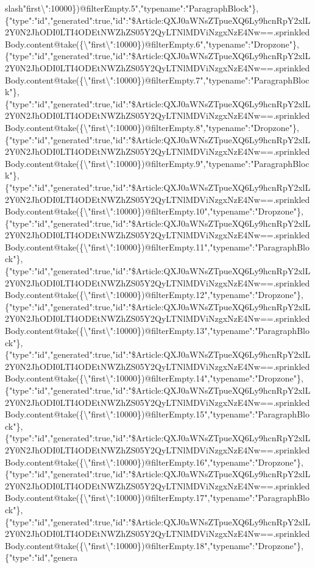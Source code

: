 slash{}"first\textbackslash{}":10000\})@filterEmpty.5","typename":"ParagraphBlock"\},\{"type":"id","generated":true,"id":"\$Article:QXJ0aWNsZTpueXQ6Ly9hcnRpY2xlL2Y0N2JhODI0LTI4ODEtNWZhZS05Y2QyLTNlMDViNzgxNzE4Nw==.sprinkledBody.content@take(\{\textbackslash{}"first\textbackslash{}":10000\})@filterEmpty.6","typename":"Dropzone"\},\{"type":"id","generated":true,"id":"\$Article:QXJ0aWNsZTpueXQ6Ly9hcnRpY2xlL2Y0N2JhODI0LTI4ODEtNWZhZS05Y2QyLTNlMDViNzgxNzE4Nw==.sprinkledBody.content@take(\{\textbackslash{}"first\textbackslash{}":10000\})@filterEmpty.7","typename":"ParagraphBlock"\},\{"type":"id","generated":true,"id":"\$Article:QXJ0aWNsZTpueXQ6Ly9hcnRpY2xlL2Y0N2JhODI0LTI4ODEtNWZhZS05Y2QyLTNlMDViNzgxNzE4Nw==.sprinkledBody.content@take(\{\textbackslash{}"first\textbackslash{}":10000\})@filterEmpty.8","typename":"Dropzone"\},\{"type":"id","generated":true,"id":"\$Article:QXJ0aWNsZTpueXQ6Ly9hcnRpY2xlL2Y0N2JhODI0LTI4ODEtNWZhZS05Y2QyLTNlMDViNzgxNzE4Nw==.sprinkledBody.content@take(\{\textbackslash{}"first\textbackslash{}":10000\})@filterEmpty.9","typename":"ParagraphBlock"\},\{"type":"id","generated":true,"id":"\$Article:QXJ0aWNsZTpueXQ6Ly9hcnRpY2xlL2Y0N2JhODI0LTI4ODEtNWZhZS05Y2QyLTNlMDViNzgxNzE4Nw==.sprinkledBody.content@take(\{\textbackslash{}"first\textbackslash{}":10000\})@filterEmpty.10","typename":"Dropzone"\},\{"type":"id","generated":true,"id":"\$Article:QXJ0aWNsZTpueXQ6Ly9hcnRpY2xlL2Y0N2JhODI0LTI4ODEtNWZhZS05Y2QyLTNlMDViNzgxNzE4Nw==.sprinkledBody.content@take(\{\textbackslash{}"first\textbackslash{}":10000\})@filterEmpty.11","typename":"ParagraphBlock"\},\{"type":"id","generated":true,"id":"\$Article:QXJ0aWNsZTpueXQ6Ly9hcnRpY2xlL2Y0N2JhODI0LTI4ODEtNWZhZS05Y2QyLTNlMDViNzgxNzE4Nw==.sprinkledBody.content@take(\{\textbackslash{}"first\textbackslash{}":10000\})@filterEmpty.12","typename":"Dropzone"\},\{"type":"id","generated":true,"id":"\$Article:QXJ0aWNsZTpueXQ6Ly9hcnRpY2xlL2Y0N2JhODI0LTI4ODEtNWZhZS05Y2QyLTNlMDViNzgxNzE4Nw==.sprinkledBody.content@take(\{\textbackslash{}"first\textbackslash{}":10000\})@filterEmpty.13","typename":"ParagraphBlock"\},\{"type":"id","generated":true,"id":"\$Article:QXJ0aWNsZTpueXQ6Ly9hcnRpY2xlL2Y0N2JhODI0LTI4ODEtNWZhZS05Y2QyLTNlMDViNzgxNzE4Nw==.sprinkledBody.content@take(\{\textbackslash{}"first\textbackslash{}":10000\})@filterEmpty.14","typename":"Dropzone"\},\{"type":"id","generated":true,"id":"\$Article:QXJ0aWNsZTpueXQ6Ly9hcnRpY2xlL2Y0N2JhODI0LTI4ODEtNWZhZS05Y2QyLTNlMDViNzgxNzE4Nw==.sprinkledBody.content@take(\{\textbackslash{}"first\textbackslash{}":10000\})@filterEmpty.15","typename":"ParagraphBlock"\},\{"type":"id","generated":true,"id":"\$Article:QXJ0aWNsZTpueXQ6Ly9hcnRpY2xlL2Y0N2JhODI0LTI4ODEtNWZhZS05Y2QyLTNlMDViNzgxNzE4Nw==.sprinkledBody.content@take(\{\textbackslash{}"first\textbackslash{}":10000\})@filterEmpty.16","typename":"Dropzone"\},\{"type":"id","generated":true,"id":"\$Article:QXJ0aWNsZTpueXQ6Ly9hcnRpY2xlL2Y0N2JhODI0LTI4ODEtNWZhZS05Y2QyLTNlMDViNzgxNzE4Nw==.sprinkledBody.content@take(\{\textbackslash{}"first\textbackslash{}":10000\})@filterEmpty.17","typename":"ParagraphBlock"\},\{"type":"id","generated":true,"id":"\$Article:QXJ0aWNsZTpueXQ6Ly9hcnRpY2xlL2Y0N2JhODI0LTI4ODEtNWZhZS05Y2QyLTNlMDViNzgxNzE4Nw==.sprinkledBody.content@take(\{\textbackslash{}"first\textbackslash{}":10000\})@filterEmpty.18","typename":"Dropzone"\},\{"type":"id","genera